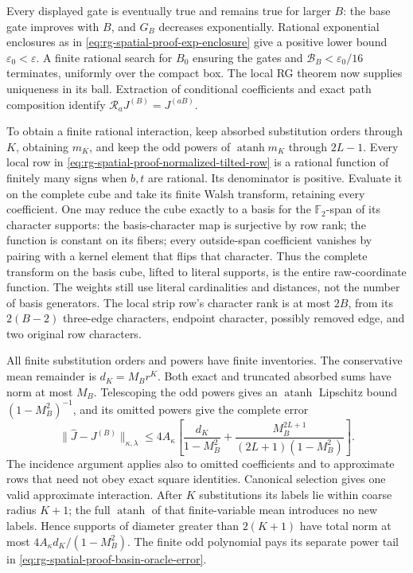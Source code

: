 Every displayed gate is eventually true and remains true for larger
\(B\): the base gate improves with \(B\), and \(G_B\) decreases
exponentially. Rational exponential enclosures as in
\cref{eq:rg-spatial-proof-exp-enclosure} give a positive lower bound
\(\varepsilon_0<\varepsilon\). A finite rational search for \(B_0\)
ensuring the gates and \(\mathcal B_B<\varepsilon_0/16\) terminates,
uniformly over the compact box. The local RG theorem now supplies
uniqueness in its ball. Extraction of conditional coefficients and exact
path composition identify \(\mathcal R_aJ^{(B)}=J^{(aB)}\).

To obtain a finite rational interaction, keep absorbed substitution orders
through \(K\), obtaining \(m_K\), and keep the odd powers of
\(\operatorname{atanh}m_K\) through \(2L-1\). Every local row in
\cref{eq:rg-spatial-proof-normalized-tilted-row} is a rational function of
finitely many signs when \(b,t\) are rational. Its denominator is
positive. Evaluate it on the complete cube and take its finite Walsh
transform, retaining every coefficient. One may reduce the cube exactly
to a basis for the \(\mathbb F_2\)-span of its character supports: the
basis-character map is surjective by row rank; the function is constant
on its fibers; every outside-span coefficient vanishes by pairing with a
kernel element that flips that character. Thus the complete transform on
the basis cube, lifted to literal supports, is the entire raw-coordinate
function. The weights still use literal cardinalities and distances, not
the number of basis generators. The local strip row's character rank is
at most \(2B\), from its \(2(B-2)\) three-edge characters, endpoint
character, possibly removed edge, and two original row characters.

All finite substitution orders and powers have finite inventories. The
conservative mean remainder is \(d_K=M_Br^K\). Both exact and truncated
absorbed sums have norm at most \(M_B\). Telescoping the odd powers gives
an \(\operatorname{atanh}\) Lipschitz bound \((1-M_B^2)^{-1}\), and its
omitted powers give the complete error
\begin{equation}
 \|\widehat J-J^{(B)}\|_{\kappa,\lambda}
 \le4A_\kappa\left[
       \frac{d_K}{1-M_B^2}
       +\frac{M_B^{2L+1}}{(2L+1)(1-M_B^2)}\right].
 \label{eq:rg-spatial-proof-basin-oracle-error}
\end{equation}
The incidence argument applies also to omitted coefficients and to
approximate rows that need not obey exact square identities. Canonical
selection gives one valid approximate interaction. After \(K\)
substitutions its labels lie within coarse radius \(K+1\); the full
\(\operatorname{atanh}\) of that finite-variable mean introduces no new
labels. Hence supports of diameter greater than \(2(K+1)\) have total
norm at most \(4A_\kappa d_K/(1-M_B^2)\). The finite odd polynomial pays
its separate power tail in
\cref{eq:rg-spatial-proof-basin-oracle-error}.

